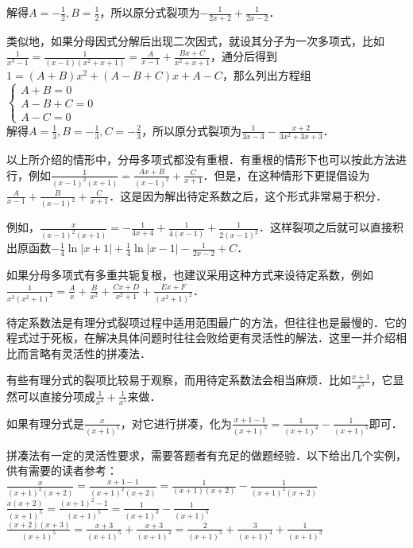 \documentclass{ctexbook}
\begin{document}
解得$A=-\frac{1}{2},B=\frac{1}{2}$，所以原分式裂项为$-\frac{1}{2x+2}+\frac{1}{2x-2}$．\par
类似地，如果分母因式分解后出现二次因式，就设其分子为一次多项式，比如$\frac{1}{x^{3}-1}=\frac{1}{\left(x-1\right)\left(x^{2}+x+1\right)}=\frac{A}{x-1}+\frac{Bx+C}{x^{2}+x+1}$，通分后得到$1=\left(A+B\right)x^{2}+\left(A-B+C\right)x+A-C$，那么列出方程组\\
$\begin{cases}A+B=0\\A-B+C=0\\A-C=0\end{cases}$\\
解得$A=\frac{1}{3},B=-\frac{1}{3},C=-\frac{2}{3}$，所以原分式裂项为$\frac{1}{3x-3}-\frac{x+2}{3x^{2}+3x+3}$．\par
以上所介绍的情形中，分母多项式都没有重根．有重根的情形下也可以按此方法进行，例如$\frac{1}{\left(x-1\right)^{2}\left(x+1\right)}=\frac{Ax+B}{\left(x-1\right)^{2}}+\frac{C}{x+1}$．但是，在这种情形下更提倡设为$\frac{A}{x-1}+\frac{B}{\left(x-1\right)^{2}}+\frac{C}{x+1}$．这是因为解出待定系数之后，这个形式非常易于积分．\par
例如，$\frac{x}{\left(x-1\right)^{2}\left(x+1\right)}=-\frac{1}{4x+4}+\frac{1}{4\left(x-1\right)}+\frac{1}{2\left(x-1\right)^{2}}$．这样裂项之后就可以直接积出原函数$-\frac{1}{4}\ln{|x+1|}+\frac{1}{4}\ln{|x-1|}-\frac{1}{2x-2}+C$．\par
如果分母多项式有多重共轭复根，也建议采用这种方式来设待定系数，例如$\frac{1}{x^{2}\left(x^{2}+1\right)^{2}}=\frac{A}{x}+\frac{B}{x^{2}}+\frac{Cx+D}{x^{2}+1}+\frac{Ex+F}{\left(x^{2}+1\right)^{2}}$．\par
待定系数法是有理分式裂项过程中适用范围最广的方法，但往往也是最慢的．它的程式过于死板，在解决具体问题时往往会败给更有灵活性的解法．这里一并介绍相比而言略有灵活性的拼凑法．\par
有些有理分式的裂项比较易于观察，而用待定系数法会相当麻烦．比如$\frac{x+1}{x^{5}}$，它显然可以直接分项成$\frac{1}{x^{4}}+\frac{1}{x^{5}}$来做．\par
如果有理分式是$\frac{x}{\left(x+1\right)^{5}}$，对它进行拼凑，化为$\frac{x+1-1}{\left(x+1\right)^{5}}=\frac{1}{\left(x+1\right)^{4}}-\frac{1}{\left(x+1\right)^{5}}$即可．\par
拼凑法有一定的灵活性要求，需要答题者有充足的做题经验．以下给出几个实例，供有需要的读者参考：\\
$\frac{x}{\left(x+1\right)^{2}\left(x+2\right)}=\frac{x+1-1}{\left(x+1\right)^{2}\left(x+2\right)}=\frac{1}{\left(x+1\right)\left(x+2\right)}-\frac{1}{\left(x+1\right)^{2}\left(x+2\right)}$\\
$\frac{x\left(x+2\right)}{\left(x+1\right)^{5}}=\frac{\left(x+1\right)^{2}-1}{\left(x+1\right)^{5}}=\frac{1}{\left(x+1\right)^{3}}-\frac{1}{\left(x+1\right)^{5}}$\\
$\frac{\left(x+2\right)\left(x+3\right)}{\left(x+1\right)^{5}}=\frac{x+3}{\left(x+1\right)^{5}}+\frac{x+3}{\left(x+1\right)^{4}}=\frac{2}{\left(x+1\right)^{5}}+\frac{3}{\left(x+1\right)^{4}}+\frac{1}{\left(x+1\right)^{3}}$\\
\end{document}
